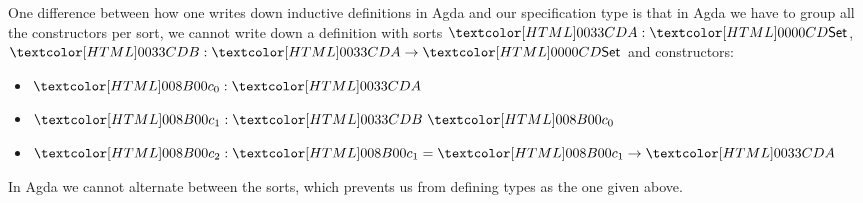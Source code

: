One difference between how one writes down inductive definitions in
Agda and our specification type is that in Agda we have to group all
the constructors per sort, \ie we cannot write down a definition with
sorts $\Aty : \Set$, $\Bty : \Aty \to \Set$ and constructors:
%
\begin{itemize}
\item $\Aco : \Aty$
\item $\Bci : \Bty\ \Aco$
\item $\Acii : \Bci = \Bci \to \Aty$
\end{itemize}
%
In Agda we cannot alternate between the sorts, which prevents us from
defining types as the one given above.
